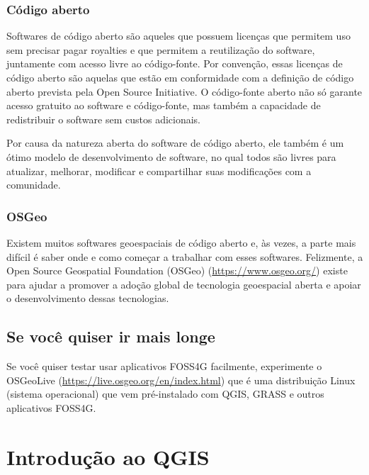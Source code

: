 \documentclass[
]{krantz}
\begin{document}
\hypertarget{cuxf3digo-aberto}{%
\subsection{Código aberto}\label{cuxf3digo-aberto}}

Softwares de código aberto são aqueles que possuem licenças que permitem uso sem precisar pagar royalties e que permitem a reutilização do software, juntamente com acesso livre ao código-fonte. Por convenção, essas licenças de código aberto são aquelas que estão em conformidade com a definição de código aberto prevista pela Open Source Initiative. O código-fonte aberto não só garante acesso gratuito ao software e código-fonte, mas também a capacidade de redistribuir o software sem custos adicionais.

Por causa da natureza aberta do software de código aberto, ele também é um ótimo modelo de desenvolvimento de software, no qual todos são livres para atualizar, melhorar, modificar e compartilhar suas modificações com a comunidade.

\hypertarget{osgeo}{%
\subsection{OSGeo}\label{osgeo}}

Existem muitos softwares geoespaciais de código aberto e, às vezes, a parte mais difícil é saber onde e como começar a trabalhar com esses softwares. Felizmente, a Open Source Geospatial Foundation (OSGeo) (\url{https://www.osgeo.org/}) existe para ajudar a promover a adoção global de tecnologia geoespacial aberta e apoiar o desenvolvimento dessas tecnologias.

\hypertarget{se-vocuxea-quiser-ir-mais-longe}{%
\section{Se você quiser ir mais longe}\label{se-vocuxea-quiser-ir-mais-longe}}

Se você quiser testar usar aplicativos FOSS4G facilmente, experimente o OSGeoLive (\url{https://live.osgeo.org/en/index.html}) que é uma distribuição Linux (sistema operacional) que vem pré-instalado com QGIS, GRASS e outros aplicativos FOSS4G.

\hypertarget{introduuxe7uxe3o-ao-qgis}{%
\chapter{Introdução ao QGIS}\label{introduuxe7uxe3o-ao-qgis}}
\end{document}
